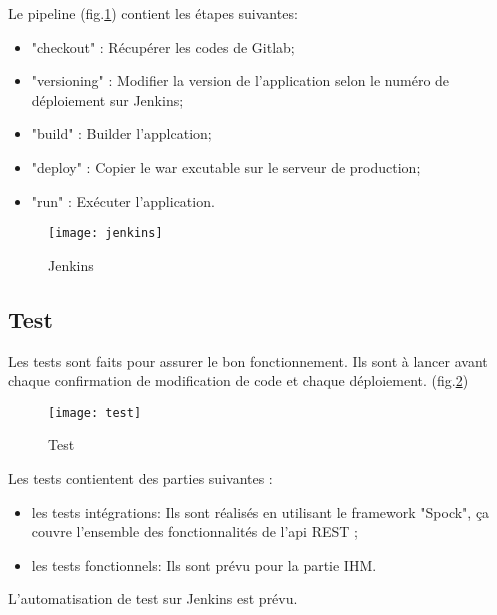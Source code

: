 Le pipeline (fig.\ref{fig:jenkins}) contient les étapes suivantes:
\begin{itemize}
 \item "checkout" : Récupérer les codes de Gitlab;
 \item "versioning" : Modifier la version de l'application selon le numéro de déploiement sur Jenkins;
 \item "build" : Builder l'applcation;
 \item "deploy" : Copier le war excutable sur le serveur de production;
 \item "run" : Exécuter l'application.
\end{itemize}

\begin{figure}[ht]
 \centering
 \texttt{[image: jenkins]}
 \caption{Jenkins}
 \label{fig:jenkins}
\end{figure}

\subsection{Test}

Les tests sont faits pour assurer le bon fonctionnement.
Ils sont à lancer avant chaque confirmation de modification de code et chaque déploiement. (fig.\ref{fig:test})

\begin{figure}[ht]
 \centering
 \texttt{[image: test]}
 \caption{Test}
 \label{fig:test}
\end{figure}

Les tests contientent des parties suivantes :
\begin{itemize}
 \item les tests intégrations: Ils sont réalisés en utilisant le framework "Spock",
       ça couvre l'ensemble des fonctionnalités de l'api REST ;
 \item les tests fonctionnels: Ils sont prévu pour la partie IHM.
\end{itemize}

L'automatisation de test sur Jenkins est prévu.

\clearpage
